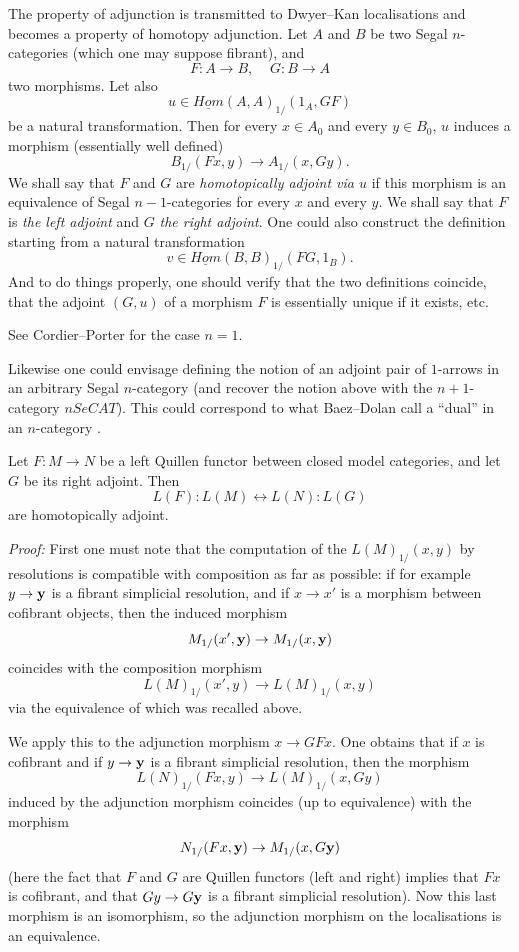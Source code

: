 
The property of adjunction is transmitted to Dwyer--Kan localisations
and becomes a property of homotopy adjunction. Let $A$ and $B$ be two
Segal $n$-categories (which one may suppose fibrant), and
$$
F: A\rightarrow B,\;\;\;\; G: B\rightarrow A
$$
two morphisms. Let also
$$
u\in \underline{Hom}(A,A)_{1/}(1_A, GF)
$$
be a natural transformation. Then
for every $x\in A_0$ and every $y\in B_0$, $u$ induces a morphism
(essentially
well defined)
$$
B_{1/}(Fx,y)\rightarrow A_{1/}(x,Gy).
$$
We shall say that $F$ and $G$ are {\em homotopically adjoint via $u$} if
this morphism is an equivalence of Segal $n-1$-categories for every
$x$ and every $y$. We shall say that $F$ is {\em the left adjoint} and $G$ {\em
the right
adjoint}. One could also construct the definition starting from
a natural
transformation
$$
v\in \underline{Hom}(B,B)_{1/}(FG,1_B).
$$
And to do things properly, one should verify
that the two definitions coincide, that the adjoint
$(G,u)$ of a morphism $F$ is essentially unique if it exists, etc.

See Cordier--Porter \cite{CordierPorter} for the case $n=1$.

Likewise one could envisage defining the notion of an adjoint pair of
$1$-arrows in an arbitrary Segal $n$-category (and recover the
notion above with the $n+1$-category $nSeCAT$). This could correspond
to what
Baez--Dolan call a ``dual'' in an $n$-category
\cite{BaezDolan}.

\begin{lemma}
\label{adjointh}
Let $F:M\rightarrow N$ be a left Quillen functor between closed model
categories, and let $G$ be its right adjoint.
Then
$$
L(F): L(M)\leftrightarrow L(N): L(G)
$$
are homotopically adjoint.
\end{lemma}
{\em Proof:}
First one must note that the computation of the $L(M)_{1/}(x,y)$ by
resolutions is
compatible with composition as far as possible: if for example
$y\rightarrow {\bf y}$ is a fibrant simplicial resolution, and if
$x\rightarrow x'$ is a morphism between cofibrant objects, then
the induced morphism
$$
M_{1/}(x',{\bf y})\rightarrow M_{1/}(x,{\bf y})
$$
coincides with the composition morphism
$$
L(M)_{1/}(x',y)\rightarrow L(M)_{1/}(x,y)
$$
via the equivalence of \cite{DwyerKan2} which was recalled above.

We apply this to the adjunction morphism $x\rightarrow GFx$.
One obtains that if $x$ is cofibrant and if $y\rightarrow {\bf y}$ is a
fibrant simplicial resolution, then the morphism
$$
L(N)_{1/}(Fx,y)\rightarrow L(M)_{1/}(x,Gy)
$$
induced by the adjunction morphism coincides (up to equivalence)
with the morphism
$$
N_{1/}(Fx, {\bf y})\rightarrow M_{1/}(x,G{\bf y})
$$
(here the fact that $F$ and $G$ are Quillen functors (left and
right) implies that $Fx$ is cofibrant, and that $Gy\rightarrow G{\bf y}$ is a
fibrant simplicial resolution). Now this last morphism is an isomorphism,
so the adjunction morphism on the localisations is an equivalence.
\eop



